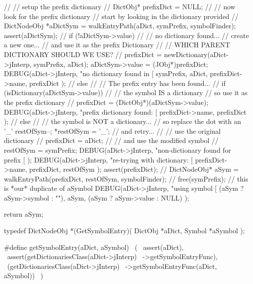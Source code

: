 {  //
  // setup the prefix dictionary
  //
  DictObj* prefixDict = NULL;
  //
  // now look for the prefix dictionary
  // start by looking in the dictionary provided
  //
  DictNodeObj *aDictSym =
    walkEntryPath(aDict, symPrefix, symbolFinder);
  assert(aDictSym);
  //
  if (!aDictSym->value) {
    //
    // no dictionary found...
    // create a new one...
    // and use it as the prefix Dictionary
    //
    // WHICH PARENT DICTIONARY SHOULD WE USE?
    //
    prefixDict = 
      newDictionary(aDict->jInterp, symPrefix, aDict);
    aDictSym->value = (JObj*)prefixDict;
    DEBUG(aDict->jInterp,
      "no dictionary found in [%
      symPrefix, aDict, prefixDict->name, prefixDict
    );
    //
  } else {
    //
    // The prefix entry has been found...
    //
    if (isDictionary(aDictSym->value)) {
      //
      // the symbol IS a dictionary
      // so use it as the prefix dictionary
      //
      prefixDict = (DictObj*)(aDictSym->value);
      DEBUG(aDict->jInterp,
        "prefix dictionary found: [%
        prefixDict->name, prefixDict
      );
      //
    } else {
      //
      // the symbol is NOT a dictionary...
      // so replace the dot with an '_'
      restOfSym--;
      *restOfSym = '_';
      // and retry...
      //
      // use the original dictionary
      //
      prefixDict = aDict;
      //
      // and use the modified symbol
      //
      restOfSym = symPrefix;
      DEBUG(aDict->jInterp,
        "non-dictionary found for prefix [%
      );
      DEBUG(aDict->jInterp,
        "re-trying with dictionary: [%
        prefixDict->name, prefixDict, restOfSym
      );
    }
  }
  assert(prefixDict);
  //
  DictNodeObj* aSym =
    walkEntryPath(prefixDict, restOfSym, symbolFinder);
  //
  free(symPrefix); // this is *our* duplicate of aSymbol
  DEBUG(aDict->jInterp,
    "using symbol [%
    (aSym ? aSym->symbol : ""),
    aSym,
    (aSym ? aSym->value : NULL)
  );

  return aSym;
}
\stopCCode

\startCHeader
typedef DictNodeObj *(GetSymbolEntry)(
  DictObj *aDict,
  Symbol  *aSymbol
);

#define getSymbolEntry(aDict, aSymbol)          \
  (                                             \
    assert(aDict),                              \
    assert(getDictionariesClass(aDict->jInterp) \
      ->getSymbolEntryFunc),                    \
    (getDictionariesClass(aDict->jInterp)       \
      ->getSymbolEntryFunc(aDict, aSymbol))     \
  )

